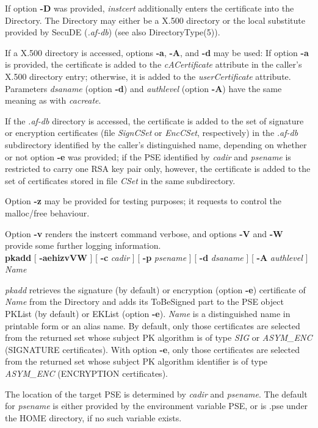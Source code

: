 If option {\bf -D} was provided, {\em instcert} additionally enters the certificate into the Directory. 
The Directory may either be a X.500 directory or the local substitute provided by 
SecuDE ({\em .af-db}) (see also DirectoryType(5)).

If a X.500 directory is accessed, options {\bf -a}, {\bf -A}, and {\bf -d} may be used:
If option {\bf -a} is provided, the certificate is added to the {\em cACertificate} attribute in
the caller's X.500 directory entry; otherwise, it is added to the {\em userCertificate}
attribute.
Parameters {\em dsaname} (option {\bf -d}) and {\em authlevel} (option {\bf -A}) have the same meaning as with {\em cacreate}.
 
If the {\em .af-db} directory is accessed, the certificate is added to the set of
signature or encryption certificates (file {\em SignCSet} or {\em EncCSet}, respectively)
in the {\em .af-db} subdirectory identified by the caller's distinguished name,
depending on whether or not option {\bf -e} was provided; if the PSE identified by 
{\em cadir} and {\em psename} is restricted to carry one RSA key pair only, 
however, the certificate is added to the set of certificates stored in file {\em CSet} in the same subdirectory.

Option {\bf -z} may be provided for testing purposes; it requests to control the malloc/free behaviour.

Option {\bf -v} renders the instcert command verbose, and options {\bf -V} and {\bf -W} 
provide some further logging
information.
\\ [1em] 
{\bf pkadd} [ {\bf -aehizvVW} ] [ {\bf -c} {\em cadir} ] [ {\bf -p} {\em psename} ] [ {\bf -d} {\em dsaname} ] [ {\bf -A} {\em authlevel} ] {\em Name}

{\em pkadd} retrieves the signature (by default) or encryption (option {\bf -e}) certificate 
of {\em Name} from the Directory
and adds its ToBeSigned part to the PSE object PKList (by default) or EKList 
(option {\bf -e}).
{\em Name} is a distinguished name in printable form or an alias name.
By default, only those certificates are selected from the returned set whose subject PK algorithm 
is of type {\em SIG} or {\em ASYM\_ENC} (SIGNATURE certificates).
With option {\bf -e}, only those certificates are selected from the returned set whose
subject PK algorithm identifier is of type {\em ASYM\_ENC} (ENCRYPTION certificates).

The location of the target PSE is determined by {\em cadir} and {\em psename}. The default for {\em 
psename} is either provided by the environment variable PSE, or is .pse under the HOME directory, if no such
variable exists.
 
